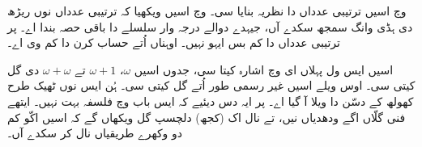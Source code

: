 \documentclass[../../../include/open-logic-section]{subfiles}
\begin{document}


 وچ اسیں ترتیبی عدداں دا نظریہ بنایا سی۔
 وچ اسیں ویکھیا کہ ترتیبی عدداں نوں ریڑھ دی ہڈی وانگ سمجھ سکدے آں، جیہدے دوالے درجہ وار سلسلے دا باقی حصہ بندا اے۔ پر ترتیبی عدداں دا کم بس ایہو نہیں۔ اوہناں اُتے حساب کرن دا کم وی اے۔

اسیں ایس ول پہلاں ای  وچ اشارہ کیتا سی، جدوں اسیں $\omega$، $\omega+1$ تے $\omega+\omega$ دی گل کیتی سی۔ اوس ویلے اسیں غیر رسمی طور اُتے گل کیتی سی۔ ہُن ایس نوں ٹھیک طرح کھولھ کے دسّن دا ویلا آ گیا اے۔ پر ایہ دس دیئیے کہ ایس باب وچ فلسفہ بہت نہیں۔ ایتھے فنی گلّاں اگے ودھدیاں نیں، تے نال اک (کجھ) دلچسپ گل ویکھاں گے کہ اسیں اکّو کم دو وکھرے طریقیاں نال کر سکدے آں۔
\end{document}

